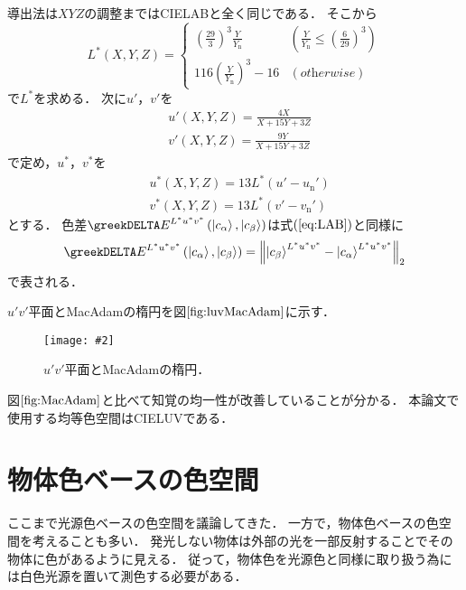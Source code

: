 \documentclass[uplatex,paper=a4,fontsize=4.0truemm,jafontsize=4.0truemm,head_space=30.0truemm,foot_space=30.0truemm,baselineskip=8.0truemm,line_length=40zw,gutter=25.0truemm,oneside,openany,fleqn,hanging_panctuation,open_bracket_pos=nibu_tentsuki,dvipdfmx,jis2004,book,titlepage]{jlreq}
\theoremstyle{mystyle}
\newcommand{\captiondot}[1]{\caption{#1．}}
\newcommand{\figureinput}[4]{\begin{figure}[btp]\centering\texttt{[image: \#2]}\captiondot{#3}\label{fig:#4}\end{figure}}
\newcommand{\mathdisplaystyle}[1]{\(\displaystyle{#1}\)}
\newcommand{\Reference}[1]{\mathdisplaystyle{\ref{#1}}}
\newcommand{\Equationreference}[1]{\mathdisplaystyle{\parentheses{\ref{#1}}}}
\newcommand{\fraction}[2]{\displaystyle{\frac{\displaystyle{#1}}{\displaystyle{#2}}}}
\newcommand{\parentheses}[1]{\left(#1\right)}
\newcommand{\norm}[2]{{\left\lVert#1\right\rVert}_{#2}}
\newcommand{\Diracket}[1]{\left\lvert#1\right\rangle}
\begin{document}
			導出法は\mathdisplaystyle{XYZ}の調整まではCIELABと全く同じである．
			そこから
			\begin{equation*}
				L^\ast\parentheses{X,Y,Z}=\begin{cases}
					\parentheses{\fraction{29}{3}}^3\fraction{Y}{Y_\textrm{n}} & \parentheses{\fraction{Y}{Y_\textrm{n}}\leq\parentheses{\fraction{6}{29}}^3} \\
					116\parentheses{\fraction{Y}{Y_\textrm{n}}}^3-16 & \parentheses{\textit{otherwise}}
				\end{cases}
			\end{equation*}
			で\mathdisplaystyle{L^\ast}を求める．
			次に\mathdisplaystyle{u'}，\mathdisplaystyle{v'}を
			\begin{align*}
				&u'\parentheses{X,Y,Z}=\fraction{4X}{X+15Y+3Z}\\
				&v'\parentheses{X,Y,Z}=\fraction{9Y}{X+15Y+3Z}
			\end{align*}
			で定め，\mathdisplaystyle{u^\ast}，\mathdisplaystyle{v^\ast}を
			\begin{align*}
				&u^\ast\parentheses{X,Y,Z}=13L^\ast\parentheses{u'-{u_\textrm{n}}'}\\
				&v^\ast\parentheses{X,Y,Z}=13L^\ast\parentheses{v'-{v_\textrm{n}}'}
			\end{align*}
			とする．
			色差\mathdisplaystyle{\greekDELTA E^{L^\ast u^\ast v^\ast}\parentheses{\Diracket{c_\alpha},\Diracket{c_\beta}}}は式\Equationreference{eq:LAB}と同様に
			\begin{equation}
				\greekDELTA E^{L^\ast u^\ast v^\ast}\parentheses{\Diracket{c_\alpha},\Diracket{c_\beta}}=\norm{\Diracket{c_\beta}^{L^\ast u^\ast v^\ast}-\Diracket{c_\alpha}^{L^\ast u^\ast v^\ast}}{2}\label{eq:LUV}
			\end{equation}
			で表される．

			\mathdisplaystyle{u'v'}平面とMacAdamの楕円を図\Reference{fig:luvMacAdam}に示す．
			\figureinput{width=\linewidth}{D:/a/figs/LuvMacAdam.png}{\mathdisplaystyle{u'v'}平面とMacAdamの楕円}{luvMacAdam}
			図\Reference{fig:MacAdam}と比べて知覚の均一性が改善していることが分かる．
			本論文で使用する均等色空間はCIELUVである．
		\section{物体色ベースの色空間}
			ここまで光源色ベースの色空間を議論してきた．
			一方で，物体色ベースの色空間を考えることも多い．
			発光しない物体は外部の光を一部反射することでその物体に色があるように見える．
			従って，物体色を光源色と同様に取り扱う為には白色光源を置いて測色する必要がある．
\end{document}
